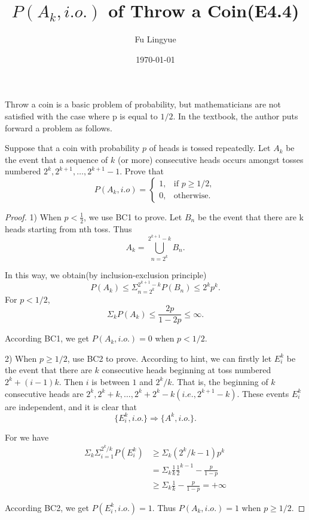 

\title{$P(A_k,i.o.)$ of Throw a Coin(E4.4)}
\author{Fu Lingyue}
\date{\today}


\maketitle

Throw a coin is a basic problem of probability, but mathematicians are not satisfied with the case where p is equal to $1/2$. In the textbook, the author puts forward a problem as follows.
\begin{theorem}
  Suppose that a coin with probability $p$ of heads is tossed repeatedly. Let $A_k$ be the event that a sequence of $k$ (or more) consecutive heads occurs amongst tosses numbered $2^k,2^{k+1},…,2^{k+1}-1$. Prove that
  \begin{equation}
  P(A_k,i.o) = 
    \begin{cases}
      1, & \text{if } p \geq 1/2,\\
      0, & \text{otherwise.}

    \end{cases}      
  \end{equation}

\end{theorem}
  
  
  \begin{proof}
1) When $p < \frac{1}{2}$, we use BC1 to prove. Let $B_n$ be the event that there are k heads starting from nth toss. Thus
  $$A_k = \bigcup_{n=2^k}^{2^{k+1}-k}B_n.$$
  
In this way, we obtain(by inclusion-exclusion principle)
$$
P(A_k) \leq \Sigma_{n=2^k}^{2^{k+1}-k}P(B_n) \leq 2^kp^k.
$$
  For $p<1/2$, 
  $$\Sigma_kP(A_k) \leq \frac{2p}{1-2p} \leq \infty.$$
  
  According BC1, we get $P(A_k,i.o.) = 0$ when $p<1/2.$
   
2) When $p\geq 1/2$, use BC2 to prove. According to hint, we can firstly let $E^k_i$ be the event that there are $k$ consecutive heads beginning at toss numbered $2^k+(i-1)k$. Then $i$ is between $1$ and $2^k/k$. That is, the beginning of $k$ consecutive heads are $2^k, 2^k + k, \dots ,2^{k} + 2^{k}-k(i.e.,2^{k+1}-k)$. These events $E_i^k$ are independent, and it is clear that 
   $$\{E_i^k,i.o.\} \Rightarrow \{A^k,i.o.\}.$$
   
   For we have 
   \begin{equation}
   \begin{aligned}
    \Sigma_k\Sigma_{i=1}^{2^k/k}P(E_i^k) &\geq \Sigma_k(2^k/k - 1)p^k \\
    &= \Sigma_k\frac{1}{k}\frac{1}{2}^{k-1} - \frac{p}{1-p}\\
    &\geq \Sigma_k\frac{1}{k} - \frac{p}{1-p} = +\infty
   \end{aligned}
 \end{equation} 
 
   According BC2, we get $P(E_i^k,i.o.) =1$. Thus $P(A_k,i.o.) = 1$ when $p\geq 1/2.$
  \end{proof}

